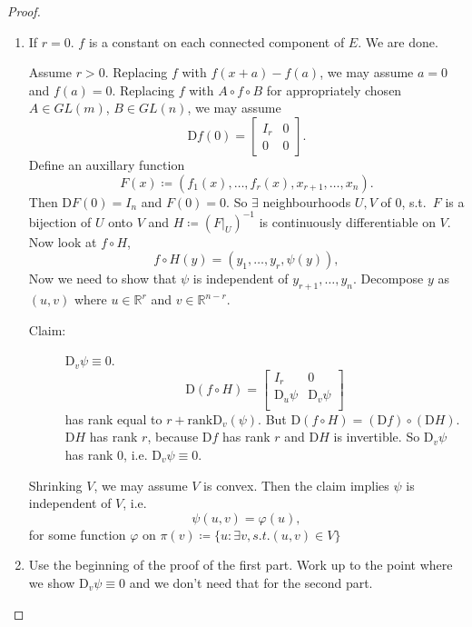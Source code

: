 \documentclass[12pt]{article}
\theoremstyle{plain}
\theoremstyle{definition}
\begin{document}
\begin{proof}
    \begin{enumerate}
        \item
            If $r=0$.
            $f$ is a constant on each connected component of $E$.
            We are done.

            Assume $r>0$.
            Replacing $f$ with $f(x+a)-f(a)$, we may assume $a=0$ and $f(a) = 0$.
            Replacing $f$ with $A\circ f\circ B$ for appropriately chosen $A\in GL(m)$, $B\in GL(n)$, we may assume
            \[
                \mathrm{D}f(0) = \begin{bmatrix}
                    I_r&0\\
                    0&0
                \end{bmatrix}.
            \]
            Define an auxillary function
            \[
                F(x)\coloneqq (f_1(x), \ldots, f_r(x),x_{r+1},\ldots,x_n).
            \]
            Then $\mathrm{D}F(0) = I_n$ and $F(0) = 0$.
            So $\exists$ neighbourhoods $U, V$ of $0$, s.t.\ $F$ is a bijection of $U$ onto $V$ and $H\coloneqq (F|_U)^{-1}$ is continuously
            differentiable on $V$.
            Now look at $f\circ H$,
            \[
                f\circ H(y) = (y_1,\ldots,y_r,\psi(y)),
            \]
            Now we need to show that $\psi$ is independent of $y_{r+1},\ldots,y_n$.
            Decompose $y$ as $(u, v)$ where $u\in\mathbb{R}^r$ and $v\in\mathbb{R}^{n-r}$.
            \begin{description}
                \item[Claim: ]$\mathrm{D}_v\psi \equiv 0$.\\
                    \[
                        \mathrm{D}(f\circ H) = \begin{bmatrix}
                            I_r&0\\
                            \mathrm{D}_u\psi&\mathrm{D}_v\psi\\
                        \end{bmatrix}
                    \]
                    has rank equal to $r+\text{rank}\mathrm{D}_v(\psi)$.
                    But $\mathrm{D}(f\circ H) = (\mathrm{D}f)\circ (\mathrm{D}H)$.
                    $\mathrm{D}H$ has rank $r$, because $\mathrm{D}f$ has rank $r$ and $\mathrm{D}H$ is invertible.
                    So $\mathrm{D}_v\psi$ has rank $0$, i.e.
                    $\mathrm{D}_v\psi\equiv 0$.
            \end{description}
            Shrinking $V$, we may assume $V$ is convex.
            Then the claim implies $\psi$ is independent of $V$, i.e.
            \[
                \psi(u,v) = \varphi(u),
            \]
            for some function $\varphi$ on $\pi(v)\coloneqq\{u:\exists v, s.t. (u,v)\in V\}$
        \item 
            Use the beginning of the proof of the first part. Work up to the point where we show $\mathrm{D}_v\psi\equiv0$ and we don't need that for the second part.
    \end{enumerate}
\end{proof}
\end{document}
